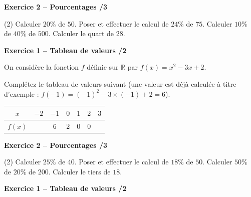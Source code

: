 \documentclass[10pt,a4paper]{article}
\begin{document}
\vspace{3cm}

\textbf{Exercice 2 -- Pourcentages \hfill /3}

\begin{tasks}(2)
    \task Calculer \(20\%\) de \(50\).
    \task Poser et effectuer le calcul de \(24\%\) de \(75\).
    \task Calculer \(10\%\) de \(40\%\) de \(500\).
    \task Calculer le quart de \(28\).
\end{tasks}

\newpage



\textbf{Exercice 1 -- Tableau de valeurs \hfill /2}

On considère la fonction \(f\) définie sur \(\mathbb{R}\) par \(f(x)=x^2-3x+2\).

Complétez le tableau de valeurs suivant (une valeur est déjà calculée à titre d'exemple : \(f(-1)=(-1)^2-3\times(-1)+2=6\)).

\begin{center}
    \renewcommand{\arraystretch}{1.5}
    \setlength{\tabcolsep}{0.25cm}
    \begin{tabular}{|*{7}{c|}}
    \hline
    \(x\) & \(-2\) & \(-1\) & \(0\) & \(1\) & \(2\) & \(3\) \\
    \hline
    \(f(x)\) & & \(6\) & \(2\) & \(0\) & \(0\) & \\
    \hline
    \end{tabular}
\end{center}

\vspace{3cm}

\textbf{Exercice 2 -- Pourcentages \hfill /3}

\begin{tasks}(2)
    \task Calculer \(25\%\) de \(40\).
    \task Poser et effectuer le calcul de \(18\%\) de \(50\).
    \task Calculer \(50\%\) de \(20\%\) de \(200\).
    \task Calculer le tiers de \(18\).
\end{tasks}

\newpage



\textbf{Exercice 1 -- Tableau de valeurs \hfill /2}
\end{document}
